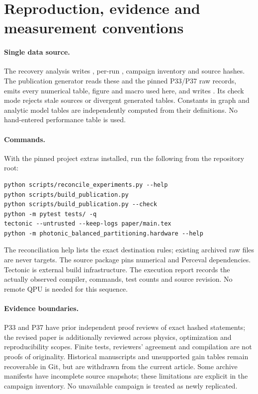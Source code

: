 \section{Reproduction, evidence and measurement conventions}\label{app:repro}
\paragraph{Single data source.}
The recovery analysis writes , per-run , campaign inventory and source hashes. The publication generator reads these and the pinned P33/P37 raw records, emits every numerical table, figure and macro used here, and writes . Its check mode rejects stale sources or divergent generated tables. Constants in graph and analytic model tables are independently computed from their definitions. No hand-entered performance table is used.

\paragraph{Commands.}
With the pinned project extras installed, run the following from the repository root:
\begin{verbatim}
python scripts/reconcile_experiments.py --help
python scripts/build_publication.py
python scripts/build_publication.py --check
python -m pytest tests/ -q
tectonic --untrusted --keep-logs paper/main.tex
python -m photonic_balanced_partitioning.hardware --help
\end{verbatim}
The reconciliation help lists the exact destination rules; existing archived raw files are never targets. The source package pins numerical and Perceval dependencies. Tectonic is external build infrastructure. The execution report records the actually observed compiler, commands, test counts and source revision. No remote QPU is needed for this sequence.

\paragraph{Evidence boundaries.}
P33 and P37 have prior independent proof reviews of exact hashed statements; the revised paper is additionally reviewed across physics, optimization and reproducibility scopes. Finite tests, reviewers' agreement and compilation are not proofs of originality. Historical manuscripts and unsupported gain tables remain recoverable in Git, but are withdrawn from the current article. Some archive manifests have incomplete source snapshots; these limitations are explicit in the campaign inventory. No unavailable campaign is treated as newly replicated.

